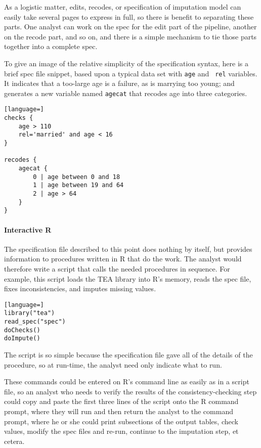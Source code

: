 \documentclass{article}
\begin{document}
As a logistic matter, edits, recodes, or specification of imputation model can easily
take several pages to express in full, so there is benefit to separating these parts.
One analyst can work on the spec for the edit part of the pipeline, another on the recode
part, and so on, and there is a simple mechanism to tie those parts together into a
complete spec.

To give an image of the relative simplicity of the specification syntax,
here is a brief spec file snippet, based upon a typical data set with {\tt age} and {\tt
rel} variables. It indicates that a too-large age is a failure, as is marrying too young;
and generates a new variable named {\tt agecat} that recodes age into three categories.

\begin{lstlisting}[language=]
checks {
    age > 110
    rel='married' and age < 16
}

recodes {
    agecat {
        0 | age between 0 and 18
        1 | age between 19 and 64
        2 | age > 64
    }
}
\end{lstlisting}


\paragraph{Interactive R}
The specification file described to this point does nothing by itself, but provides
information to procedures written in R that do the work. The analyst would therefore write
a script that calls the needed procedures in sequence. For example, this script loads the
TEA library into R's memory, reads the spec file, fixes inconsistencies, and imputes
missing values.

\begin{lstlisting}[language=]
library("tea")
read_spec("spec")
doChecks()
doImpute()
\end{lstlisting}

The script is so simple because the specification file gave all of the details of the
procedure, so at run-time, the analyst need only indicate what to run.

These commands could be entered on R's command line as easily as in a script file, so an
analyst who needs to verify the results of the consistency-checking step could copy and
paste the first three lines of the script onto the R command prompt, where they will run and
then return the analyst to the command prompt, where he or she could print subsections of
the output tables, check values, modify the spec files and re-run, continue to the
imputation step, et cetera.
\end{document}

